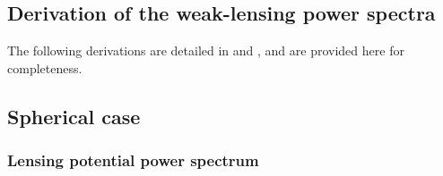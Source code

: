 \documentclass[fleqn,usenatbib]{mnras} %
\begin{document}
\begin{appendix}

\section{Derivation of the weak-lensing power spectra}
\label{sec:derivations_C}

The following derivations are detailed in \cite{2000PhRvD..62d3007H} and
\cite{2005PhRvD..72b3516C}, and are provided here for completeness.

\subsection{Spherical case}

\subsubsection{Lensing potential power spectrum}


\end{appendix}
\end{document}
